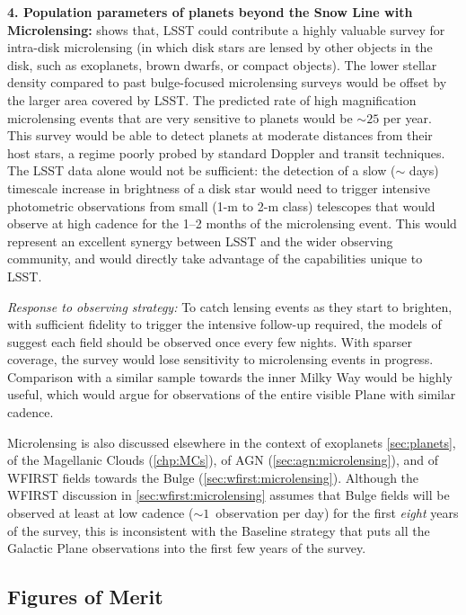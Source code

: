 {\bf 4. Population parameters of planets beyond the Snow Line with
  Microlensing:} \citet{gould13}  shows that, LSST could contribute a
highly valuable survey for intra-disk microlensing (in which disk
stars are lensed by other objects in the disk, such as exoplanets,
brown dwarfs, or compact objects). The lower stellar density compared
to past bulge-focused microlensing surveys would be offset by the
larger area covered by LSST. The predicted rate of high magnification
microlensing events that are very sensitive to planets would be $\sim
25$ per year. This survey would be able to detect planets at moderate
distances from their host stars, a regime poorly probed by standard
Doppler and transit techniques. The LSST data alone would not be
sufficient: the detection of a slow ($\sim$ days) timescale increase
in brightness of a disk star would need to trigger intensive
photometric observations from small (1-m to 2-m class) telescopes that
would observe at high cadence for the 1--2 months of the microlensing
event. This would represent an excellent synergy between LSST and the
wider observing community, and would directly take advantage of the
capabilities unique to LSST.

{\it Response to observing strategy:} To catch lensing events as they
start to brighten, with sufficient fidelity to trigger the intensive
follow-up required, the models of \citet{gould13} suggest each field
should be observed once every few nights. With sparser coverage, the
survey would lose sensitivity to microlensing events in
progress. Comparison with a similar sample towards the inner Milky Way
would be highly useful, which would argue for observations of the
entire visible Plane with similar cadence.

Microlensing is also discussed elsewhere in the context of exoplanets \autoref{sec:planets}, of the Magellanic Clouds (\autoref{chp:MCs}), of AGN
(\autoref{sec:agn:microlensing}), and of WFIRST fields towards the
Bulge (\autoref{sec:wfirst:microlensing}).  Although the WFIRST
discussion in \autoref{sec:wfirst:microlensing} assumes that Bulge
fields will be observed at least at low cadence ($\sim 1$~observation per
day) for the first {\it eight} years of the survey, this is inconsistent with the Baseline strategy that puts all the Galactic Plane observations
into the first few years of the survey.


\subsection{Figures of Merit}
\label{sec:\secname:MW_Disk_metrics}


